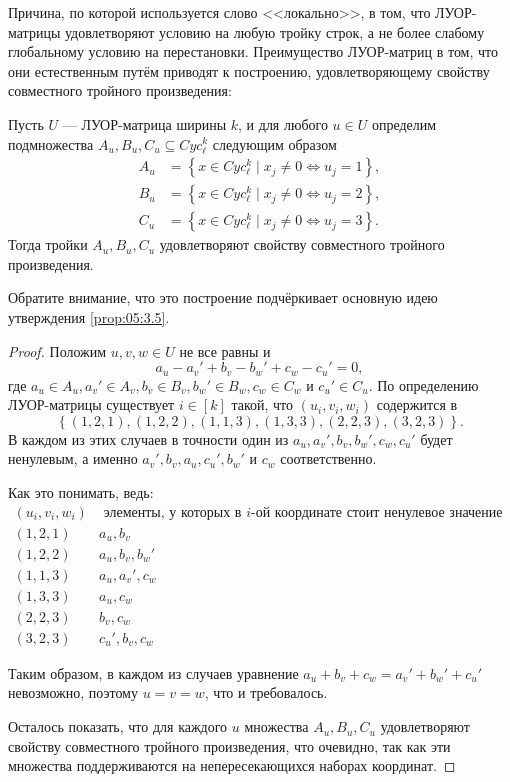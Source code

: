 Причина, по которой используется слово <<локально>>, в том, что ЛУОР-матрицы удовлетворяют условию на любую тройку строк, а не более слабому глобальному условию на перестановки. Преимущество ЛУОР-матриц в том, что они естественным путём приводят к построению, удовлетворяющему свойству совместного тройного произведения:
\begin{theorem}
  \label{th:05:6.2} Пусть $U$ --- ЛУОР-матрица ширины $k$, и для любого $u \in U$ определим подмножества $A_u, B_u, C_u \subseteq Cyc_\ell^k$ следующим образом
  \begin{align*}
  	A_u & = \left\{ x \in Cyc_\ell^k \mid x_j \neq 0 \iff u_j = 1 \right\}, \\
  	B_u & = \left\{ x \in Cyc_\ell^k \mid x_j \neq 0 \iff u_j = 2 \right\}, \\
  	C_u & = \left\{ x \in Cyc_\ell^k \mid x_j \neq 0 \iff u_j = 3 \right\}. 
  \end{align*}
  Тогда тройки $A_u, B_u, C_u$ удовлетворяют свойству совместного тройного произведения.
\end{theorem}

Обратите внимание, что это построение подчёркивает основную идею утверждения \ref{prop:05:3.5}.

\begin{proof}
Положим $u,v,w \in U$ не все равны и 
\[
	a_u - a_v' + b_v - b_w' + c_w - c_u' = 0,
\]
где $a_u \in A_u, a_v' \in A_v, b_v \in B_v, b_w' \in B_w, c_w \in C_w$ и $c_u' \in C_u$. По определению ЛУОР-матрицы существует $i \in [k]$ такой, что $(u_i,v_i,w_i)$ содержится в
\[
  	\left\{ (1,2,1), (1,2,2), (1,1,3), (1,3,3), (2,2,3), (3,2,3) \right\}.
\]
В каждом из этих случаев в точности один из $a_u,a_v',b_v,b_w',c_w,c_u'$ будет ненулевым, а именно $a_v',b_v,a_u,c_u',b_w'$ и $c_w$ соответственно. 
\begin{question}
  Как это понимать, ведь:
  \[
  	\begin{array}{c|c}
  		(u_i,v_i,w_i) & \text{ элементы, у которых в $i$-ой координате стоит ненулевое значение }\\
  		\hline
  		(1,2,1) & a_u, b_v \\
  		(1,2,2) & a_u, b_v, b_w'\\
  		(1,1,3) & a_u, a_v', c_w\\
  		(1,3,3) & a_u, c_w\\
  		(2,2,3) & b_v, c_w\\
  		(3,2,3) & c_u', b_v, c_w
  	\end{array}
  \]  
\end{question}
Таким образом, в каждом из случаев уравнение $a_u+b_v+c_w=a_v'+b_w'+c_u'$ невозможно, поэтому $u=v=w$, что и требовалось. 

Осталось показать, что для каждого $u$ множества $A_u, B_u, C_u$ удовлетворяют свойству совместного тройного произведения, что очевидно, так как эти множества поддерживаются на непересекающихся наборах координат.
\end{proof}

